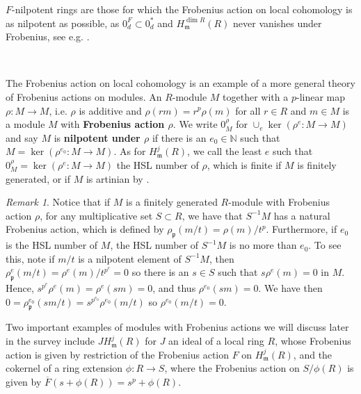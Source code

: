 \documentclass{amsproc}
\theoremstyle{definition}
\theoremstyle{remark}
\newtheorem{remark}[theorem]{Remark}
\numberwithin{equation}{section}
\newcommand{\fm}{\mathfrak{m}}
\newcommand{\fp}{\mathfrak{p}}
\begin{document}
$F$-nilpotent rings are those for which the Frobenius action on local cohomology is as nilpotent as possible, as $0^F_d \subset 0^*_d$ and $H^{\dim R}_\fm(R)$ never vanishes under Frobenius, see e.g. \cite[Lem. 4.2]{Lyu06}.

\

 The Frobenius action on local cohomology is an example of a more general theory of Frobenius actions on modules. An $R$-module $M$ together with a $p$-linear map $\rho: M\rightarrow M$, i.e. $\rho$ is additive and $\rho(rm) = r^p\rho(m)$ for all $r \in R$ and $m \in M$ is a module $M$ with {\bf Frobenius action $\rho$}. We write $0^\rho_M$ for $\cup_e \ker(\rho^e:M\rightarrow M)$ and say $M$ is {\bf nilpotent under $\rho$} if there is an $e_0 \in \mathbb{N}$ such that $M = \ker(\rho^{e_0}:M\rightarrow M)$. As for $H^j_\fm(R)$, we call the least $e$ such that $0^\rho_M = \ker(\rho^e:M\rightarrow M)$ the HSL number of $\rho$, which is finite if $M$ is finitely generated, or if $M$ is artinian by .

\begin{remark}\label{rmk: hsl drops when localizing}
    Notice that if $M$ is a finitely generated $R$-module with Frobenius action $\rho$, for any multiplicative set $S\subset R$, we have that $S^{-1}M$ has a natural Frobenius action, which is defined by $\rho_\fp(m/t) = \rho(m)/t^p$. Furthermore, if $e_0$ is the HSL number of $M$, the HSL number of $S^{-1}M$ is no more than $e_0$. To see this, note if $m/t$ is a nilpotent element of $S^{-1}M$, then $\rho^e_\fp(m/t) = \rho^e(m)/t^{p^e} = 0$ so there is an $s \in S$ such that $s\rho^e(m) = 0$ in $M$. Hence, $s^{p^e}\rho^e(m) = \rho^e(sm) = 0$, and thus $\rho^{e_0}(sm) = 0$. We have then $0=\rho^{e_0}_\fp(sm/t) = s^{p^{e_0}}\rho^{e_0}(m/t)$ so $\rho^{e_0}(m/t) =0$.
\end{remark}

Two important examples of modules with Frobenius actions we will discuss later in the survey include $JH^j_\fm(R)$ for $J$ an ideal of a local ring $R$, whose Frobenius action is given by restriction of the Frobenius action $F$ on $H^j_\fm(R)$, and the cokernel of a ring extension $\phi:R\rightarrow S$, where the Frobenius action on $S/\phi(R)$ is given by $\overline{F}(s+\phi(R)) = s^p + \phi(R)$. 

\
\end{document}
